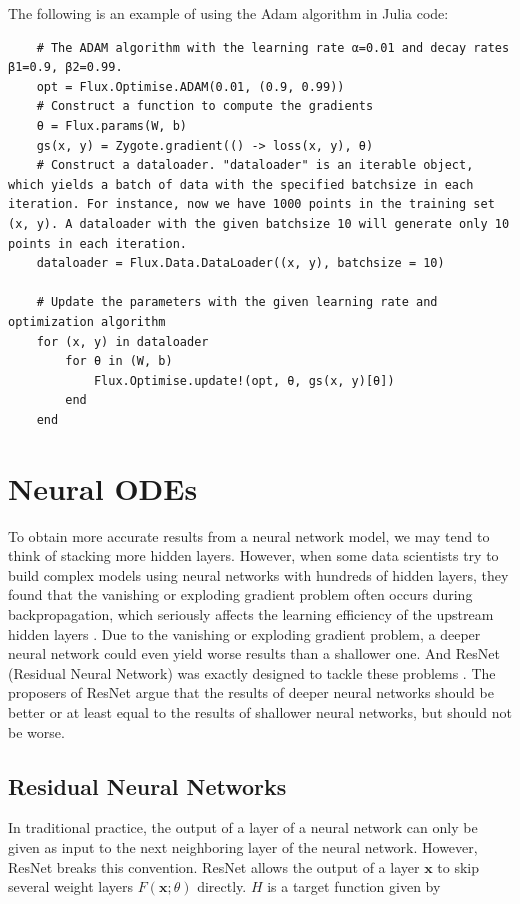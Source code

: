 \documentclass[
	parskip, 			   %
	twoside, 			   %
	DIV=14, 			   %
	BCOR=15.0mm, 		   %
	headsepline, 		   %
	open=right, 		   %
	captions=tableheading, %
	bibliography=totoc,    %
	numbers=noenddot       %
]{scrreprt}
\begin{document}
The following is an example of using the Adam algorithm in Julia code:

\begin{verbatim}
    # The ADAM algorithm with the learning rate α=0.01 and decay rates β1=0.9, β2=0.99.
    opt = Flux.Optimise.ADAM(0.01, (0.9, 0.99))
    # Construct a function to compute the gradients
    θ = Flux.params(W, b)
    gs(x, y) = Zygote.gradient(() -> loss(x, y), θ)
    # Construct a dataloader. "dataloader" is an iterable object, which yields a batch of data with the specified batchsize in each iteration. For instance, now we have 1000 points in the training set (x, y). A dataloader with the given batchsize 10 will generate only 10 points in each iteration.
    dataloader = Flux.Data.DataLoader((x, y), batchsize = 10)

    # Update the parameters with the given learning rate and optimization algorithm
    for (x, y) in dataloader
        for θ in (W, b) 
            Flux.Optimise.update!(opt, θ, gs(x, y)[θ])
        end
    end
\end{verbatim}


\clearpage
\chapter{Neural ODEs}
\label{ch:chapter5}
To obtain more accurate results from a neural network model, we may tend to think of stacking more hidden layers. However, when some data scientists try to build complex models using neural networks with hundreds of hidden layers, they found that the vanishing or exploding gradient problem often occurs during backpropagation, which seriously affects the learning efficiency of the upstream hidden layers \cite{glorot2010understanding}. Due to the vanishing or exploding gradient problem, a deeper neural network could even yield worse results than a shallower one. And ResNet (Residual Neural Network) was exactly designed to tackle these problems \cite{he2016deep}. The proposers of ResNet argue that the results of deeper neural networks should be better or at least equal to the results of shallower neural networks, but should not be worse.

\section{Residual Neural Networks}
In traditional practice, the output of a layer of a neural network can only be given as input to the next neighboring layer of the neural network. However, ResNet breaks this convention. ResNet allows the output of a layer $\mathbf{x}$ to skip several weight layers $F(\mathbf{x};\theta)$ directly. $H$ is a target function given by
\end{document}
